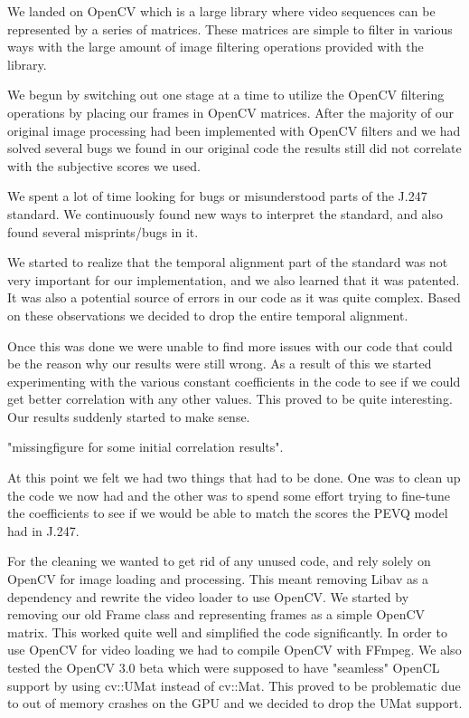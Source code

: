 We landed on OpenCV which is a large library where video sequences can be represented by a series of matrices. These matrices are simple to filter in various ways with the large amount of image filtering operations provided with the library.

We begun by switching out one stage at a time to utilize the OpenCV filtering operations by placing our frames in OpenCV matrices. After the majority of our original image processing had been implemented with OpenCV filters and we had solved several bugs we found in our original code the results still did not correlate with the subjective scores we used.

We spent a lot of time looking for bugs or misunderstood parts of the J.247 standard. We continuously found new ways to interpret the standard, and also found several misprints/bugs in it.

We started to realize that the temporal alignment part of the standard was not very important for our implementation, and we also learned that it was patented. It was also a potential source of errors in our code as it was quite complex. Based on these observations we decided to drop the entire temporal alignment. 

Once this was done we were unable to find more issues with our code that could be the reason why our results were still wrong. As a result of this we started experimenting with the various constant coefficients in the code to see if we could get better correlation with any other values. This proved to be quite interesting. Our results suddenly started to make sense.

"missingfigure for some initial correlation results".

At this point we felt we had two things that had to be done. One was to clean up the code we now had and the other was to spend some effort trying to fine-tune the coefficients to see if we would be able to match the scores the PEVQ model had in J.247.

For the cleaning we wanted to get rid of any unused code, and rely solely on OpenCV for image loading and processing. This meant removing Libav as a dependency and rewrite the video loader to use OpenCV. We started by removing our old Frame class and representing frames as a simple OpenCV matrix. This worked quite well and simplified the code significantly. In order to use OpenCV for video loading we had to compile OpenCV with FFmpeg. We also tested the OpenCV 3.0 beta which were supposed to have "seamless" OpenCL support by using cv::UMat instead of cv::Mat. This proved to be problematic due to out of memory crashes on the GPU and we decided to drop the UMat support.

